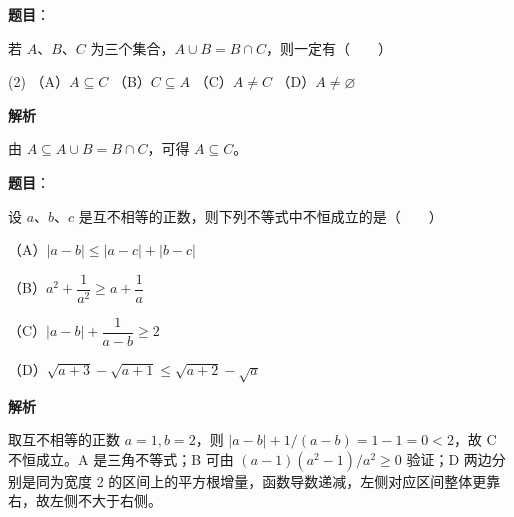 \begin{answer}

\textbf{题目}：

若 $A\text{、}B\text{、}C$ 为三个集合，$A\cup B=B\cap C$，则一定有\mbox{（　　）}

\begin{gkopts}(2)
\task （A）$A\subseteq C$
\task （B）$C\subseteq A$
\task （C）$A\ne C$
\task （D）$A\ne\varnothing$
\end{gkopts}

\textbf{解析}

由 $A\subseteq A\cup B=B\cap C$，可得 $A\subseteq C$。


\end{answer}
\begin{answer}

\textbf{题目}：

设 $a\text{、}b\text{、}c$ 是互不相等的正数，则下列不等式中不恒成立的是\mbox{（　　）}

（A）$|a-b|\leqslant|a-c|+|b-c|$

（B）$a^2+\dfrac{1}{a^2}\geqslant a+\dfrac{1}{a}$

（C）$|a-b|+\dfrac{1}{a-b}\geqslant2$

（D）$\sqrt{a+3}-\sqrt{a+1}\leqslant\sqrt{a+2}-\sqrt a$

\textbf{解析}

取互不相等的正数 $a=1,b=2$，则 $|a-b|+1/(a-b)=1-1=0<2$，故 C 不恒成立。A 是三角不等式；B 可由 $(a-1)(a^2-1)/a^2\ge0$ 验证；D 两边分别是同为宽度 2 的区间上的平方根增量，函数导数递减，左侧对应区间整体更靠右，故左侧不大于右侧。


\end{answer}
